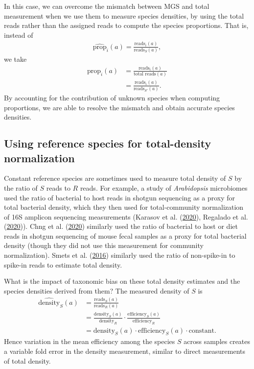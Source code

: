 \documentclass[
]{article}
\begin{document}
In this case, we can overcome the mismatch between MGS and total measurement when we use them to measure species densities, by using the total reads rather than the assigned reads to compute the species proportions.
That is, instead of
\begin{align}
  \widehat{\text{prop}}_{i}(a) = \frac{\text{reads}_i(a)}{\text{reads}_S(a)},
\end{align}
we take
\begin{align}
  \widehat{\text{prop}}_{i}(a) 
  &= \frac{\text{reads}_i(a)}{\text{total reads}(a)}
\\&= \frac{\text{reads}_i(a)}{\text{reads}_{S'}(a)}.
\end{align}
By accounting for the contribution of unknown species when computing proportions, we are able to resolve the mismatch and obtain accurate species densities.

\hypertarget{total-density-ref}{%
\subsection{Using reference species for total-density normalization}\label{total-density-ref}}

Constant reference species are sometimes used to measure total density of \(S\) by the ratio of \(S\) reads to \(R\) reads.
For example, a study of \emph{Arabidopsis} microbiomes used the ratio of bacterial to host reads in shotgun sequencing as a proxy for total bacterial density, which they then used for total-community normalization of 16S amplicon sequencing measurements (Karasov et al. (\protect\hyperlink{ref-karasov2020ther}{2020}), Regalado et al. (\protect\hyperlink{ref-regalado2019comb}{2020})).
Chng et al. (\protect\hyperlink{ref-chng2020meta}{2020}) similarly used the ratio of bacterial to host or diet reads in shotgun sequencing of mouse fecal samples as a proxy for total bacterial density (though they did not use this measurement for community normalization).
Smets et al. (\protect\hyperlink{ref-smets2016amet}{2016}) similarly used the ratio of non-spike-in to spike-in reads to estimate total density.

What is the impact of taxonomic bias on these total density estimates and the species densities derived from them?
The measured density of \(S\) is
\begin{align}
  \widehat{\text{density}}_{S}(a) 
  &= \frac{\text{reads}_S(a)}{\text{reads}_{R}(a)}
\\&= \frac{\text{density}_S(a)}{\text{density}_{R}} \cdot \frac{\text{efficiency}_S(a)}{\text{efficiency}_{R}}
\\&= \text{density}_S(a) \cdot \text{efficiency}_S(a) \cdot \text{constant}.
\end{align}
Hence variation in the mean efficiency among the species \(S\) across samples creates a variable fold error in the density measurement, similar to direct measurements of total density.
\end{document}
